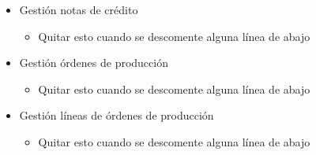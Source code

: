 \begin{itemize}
\begin{itemize}
		\end{itemize}
		\item Gestión notas de crédito
		\begin{itemize}
			\item Quitar esto cuando se descomente alguna línea de abajo
		\end{itemize}

		\item Gestión órdenes de producción
		\begin{itemize}
			\item Quitar esto cuando se descomente alguna línea de abajo
		\end{itemize}
		\item Gestión líneas de órdenes de producción
		\begin{itemize}
			\item Quitar esto cuando se descomente alguna línea de abajo
			

\end{itemize}
\end{itemize}

